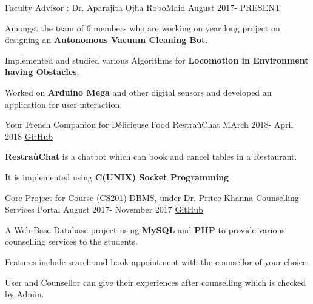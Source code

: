 \begin{cventries}
  \cventry
    {\small Faculty Advisor : Dr. Aparajita Ojha}
    {\small RoboMaid}
    {\small August 2017- PRESENT}
    {}
    {
      \begin{cvitems}\small
        \item {Amongst the team of 6 members who are working on year long project on designing an \textbf{Autonomous Vacuum Cleaning Bot}.}
        \item {Implemented and studied various Algorithms for \textbf{Locomotion in Environment having Obstacles}.}
        \item {Worked on \textbf{Arduino Mega} and other digital sensors and developed an application for user interaction.}
      \end{cvitems}
    }
\end{cventries}
\begin{cventries}
  \cventry
    {\small Your French Companion for Délicieuse Food}
    {\small RestraùChat}
    {\small MArch 2018- April 2018}
    {\small \href{https://github.com/muditjoshi98/RestrauChat/}{GitHub}}
    {
      \begin{cvitems}\small
        \item {\textbf{RestraùChat} is a chatbot which can book and cancel tables in a Restaurant.}
        \item { It is implemented using \textbf{C(UNIX) Socket Programming} }
      \end{cvitems}
    }
\end{cventries}

\begin{cventries}
  \cventry
    {\small Core Project for Course (CS201) DBMS, under Dr. Pritee Khanna}
    {\small Counselling Services Portal}
    {\small August 2017- November 2017}
    {\small \href{https://github.com/muditjoshi98/Student-Counseling-Services}{GitHub}}
    {
      \begin{cvitems}\small
        \item {A Web-Base Database project using \textbf{MySQL} and \textbf{PHP} to provide various counselling services to the students.}
        \item {Features include search and book appointment with the counsellor of your choice.}
        \item {User and Counsellor can give their experiences after counselling which is checked by Admin.}
      \end{cvitems}
    }
\end{cventries}
